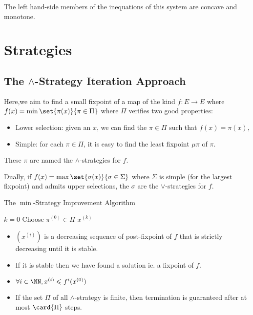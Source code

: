 \documentclass[a4paper, twoside, 10pt]{article}
\begin{document}
The left hand-side members of the inequations of this system are concave and monotone.

\section{Strategies}

\subsection{The \texorpdfstring{$\wedge$}{Min}-Strategy Iteration Approach}

Here,we aim to find a small fixpoint of a map of the kind $ f:E\to E$ where $f(x) = \min\set{\pi(x)}{\pi\in\Pi}$ where $\Pi$ verifies two good properties:
\begin{itemize}
    \item Lower selection: given an $x$, we can find the $\pi \in \Pi$ such that $f(x) = \pi(x)$,
    \item Simple: for each $\pi \in \Pi$, it is easy to find the least fixpoint $\mu\pi$ of $\pi$.
\end{itemize}

These $\pi$ are named the $\wedge$-strategies for $f$.

Dually, if $f(x) = \max\set{\sigma(x)}{\sigma\in\Sigma}$ where $\Sigma$ is simple (for the largest fixpoint) and admits upper selections, the $\sigma$ are the $\vee$-strategies for $f$.


\begin{algorithm}
    \caption{The $\min$-Strategy Improvement Algorithm}
    \DontPrintSemicolon
    $k = 0$\;
    Choose $\pi^{(0)} \in \Pi$\;
    \Return $x^{(k)}$
\end{algorithm}

\begin{theorem}
    \begin{itemize}
        \item $(x^{(i)})$ is a decreasing sequence of post-fixpoint of $f$ that is strictly decreasing until it is stable.
        \item If it is stable then we have found a solution ie. a fixpoint of $f$.
        \item $\forall i\in\NN, x^{(i)} \leqslant f^i(x^{(0)})$
        \item If the set $\Pi$ of all $\wedge$-strategy is finite, then termination is guaranteed after at most $\card{\Pi}$ steps.
    \end{itemize}
\end{theorem}
\end{document}
